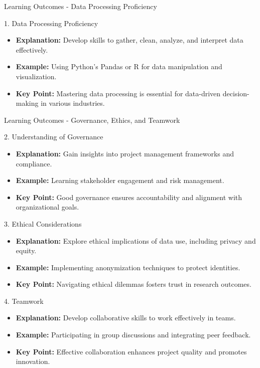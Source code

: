 \documentclass[aspectratio=169]{beamer}
\begin{document}
\begin{frame}[fragile]{Learning Outcomes - Data Processing Proficiency}
    \begin{block}{1. Data Processing Proficiency}
        \begin{itemize}
            \item \textbf{Explanation:} Develop skills to gather, clean, analyze, and interpret data effectively.
            \item \textbf{Example:} Using Python's Pandas or R for data manipulation and visualization.
            \item \textbf{Key Point:} Mastering data processing is essential for data-driven decision-making in various industries.
        \end{itemize}
    \end{block}
\end{frame}

\begin{frame}[fragile]{Learning Outcomes - Governance, Ethics, and Teamwork}
    \begin{block}{2. Understanding of Governance}
        \begin{itemize}
            \item \textbf{Explanation:} Gain insights into project management frameworks and compliance.
            \item \textbf{Example:} Learning stakeholder engagement and risk management.
            \item \textbf{Key Point:} Good governance ensures accountability and alignment with organizational goals.
        \end{itemize}
    \end{block}
    
    \begin{block}{3. Ethical Considerations}
        \begin{itemize}
            \item \textbf{Explanation:} Explore ethical implications of data use, including privacy and equity.
            \item \textbf{Example:} Implementing anonymization techniques to protect identities.
            \item \textbf{Key Point:} Navigating ethical dilemmas fosters trust in research outcomes.
        \end{itemize}
    \end{block}
    
    \begin{block}{4. Teamwork}
        \begin{itemize}
            \item \textbf{Explanation:} Develop collaborative skills to work effectively in teams.
            \item \textbf{Example:} Participating in group discussions and integrating peer feedback.
            \item \textbf{Key Point:} Effective collaboration enhances project quality and promotes innovation.
        \end{itemize}
    \end{block}
\end{frame}
\end{document}
